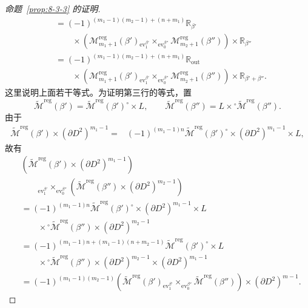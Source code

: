 \begin{proof}[命题~\ref{prop:8-3-3} 的证明]
\[\begin{aligned}
 &=(-1)^{(m_1-1)(m_2-1)+(n+m_1)}
 \mathbb R_{\beta'}\\[-2pt]
 &\qquad{}\times
 \left(
 \mathcal M_{m_1+1}^{\mathrm{reg}}(\beta')
 {}_{\operatorname{ev}_1^{\beta'}}\!\times_{\operatorname{ev}_0^{\beta''}}
 \mathcal M_{m_2+1}^{\mathrm{reg}}(\beta'')
 \right)\times\mathbb R_{\beta''}\\
 &=(-1)^{(m_1-1)(m_2-1)+(n+m_1)}
 \mathbb R_{\mathrm{out}}\\[-2pt]
 &\qquad{}\times
 \left(
 \mathcal M_{m_1+1}^{\mathrm{reg}}(\beta')
 {}_{\operatorname{ev}_1^{\beta'}}\!\times_{\operatorname{ev}_0^{\beta''}}
 \mathcal M_{m_2+1}^{\mathrm{reg}}(\beta'')
 \right)\times\mathbb R_{\beta'+\beta''}.
\end{aligned}
\]
这里说明上面若干等式。为证明第三行的等式，置
\[
 \widetilde{\mathcal M}^{\mathrm{reg}}(\beta')
 =\widetilde{\mathcal M}^{\mathrm{reg}}(\beta')^\circ\times L,
 \qquad
 \widetilde{\mathcal M}^{\mathrm{reg}}(\beta'')
 =L\times{}^\circ\widetilde{\mathcal M}^{\mathrm{reg}}(\beta'').
\]
由于
\[
\begin{aligned}
 \widetilde{\mathcal M}^{\mathrm{reg}}(\beta')
 \times(\partial D^2)^{m_1-1}
 ={}&(-1)^{(m_1-1)n}
 \widetilde{\mathcal M}^{\mathrm{reg}}(\beta')^\circ
 \times(\partial D^2)^{m_1-1}\times L,
\end{aligned}
\]
故有
\[
\begin{aligned}
 &\left(\widetilde{\mathcal M}^{\mathrm{reg}}(\beta')
        \times(\partial D^2)^{m_1-1}\right)\\[-2pt]
 &\qquad{}
 {}_{\operatorname{ev}_1^{\beta'}}\!\times_{\operatorname{ev}_0^{\beta''}}
 \left(\widetilde{\mathcal M}^{\mathrm{reg}}(\beta'')
       \times(\partial D^2)^{m_2-1}\right)\\
 &={}
 (-1)^{(m_1-1)n}
 \widetilde{\mathcal M}^{\mathrm{reg}}(\beta')^\circ
 \times(\partial D^2)^{m_1-1}\times L\\[-2pt]
 &\qquad{}\times{}^\circ
 \widetilde{\mathcal M}^{\mathrm{reg}}(\beta'')
 \times(\partial D^2)^{m_2-1}\\
 &={}
 (-1)^{(m_1-1)n+(m_1-1)(n+m_2-1)}
 \widetilde{\mathcal M}^{\mathrm{reg}}(\beta')^\circ
 \times L\\[-2pt]
 &\qquad{}\times{}^\circ
 \widetilde{\mathcal M}^{\mathrm{reg}}(\beta'')
 \times(\partial D^2)^{m_2-1}\times(\partial D^2)^{m_1-1}\\
 &=(-1)^{(m_1-1)(m_2-1)}
 \left(
 \widetilde{\mathcal M}^{\mathrm{reg}}(\beta')
 {}_{\operatorname{ev}_1^{\beta'}}\!\times_{\operatorname{ev}_0^{\beta''}}
 \widetilde{\mathcal M}^{\mathrm{reg}}(\beta'')
 \right)\times(\partial D^2)^{m-1}.
\end{aligned}
\]


\end{proof}
